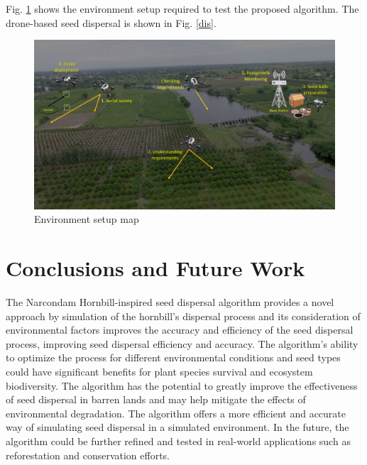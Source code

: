 \documentclass[conference]{IEEEtran}
\begin{document}
Fig. \ref{env} shows the environment setup required to test the proposed algorithm. The drone-based seed dispersal is shown in Fig. \ref{dis}.
\begin{figure}[htp]
    \centering
    \includegraphics[scale=0.25]{hornbill.png}
    \caption{Environment setup map}
    \label{env}
\end{figure}



\section{Conclusions and Future Work}
The Narcondam Hornbill-inspired seed dispersal algorithm provides a novel approach by simulation of the hornbill's dispersal process and its consideration of environmental factors improves the accuracy and efficiency of the seed dispersal process, improving seed dispersal efficiency and accuracy. The algorithm's ability to optimize the process for different environmental conditions and seed types could have significant benefits for plant species survival and ecosystem biodiversity. The algorithm has the potential to greatly improve the effectiveness of seed dispersal in barren lands and may help mitigate the effects of environmental degradation. The algorithm offers a more efficient and accurate way of simulating seed dispersal in a simulated environment. In the future, the algorithm could be further refined and tested in real-world applications such as reforestation and conservation efforts.
\end{document}

